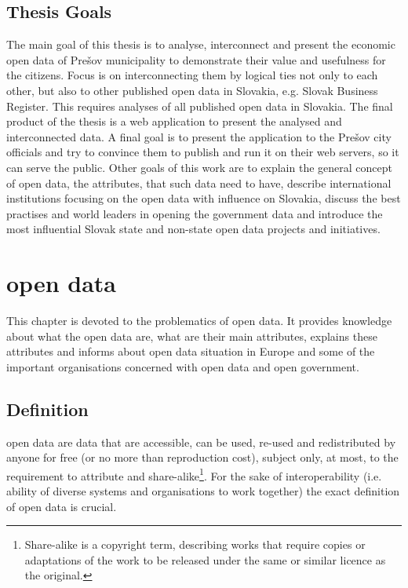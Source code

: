 \documentclass[thesis=B,english]{FITthesis}[2012/06/26]
\begin{document}
\begin{introduction}
	\section*{Thesis Goals}
	The main goal of this thesis is to analyse, interconnect and present the economic open data of Prešov municipality to demonstrate their value and usefulness for the citizens. Focus is on interconnecting them by logical ties not only to each other, but also to other published open data in Slovakia, e.g. Slovak Business Register. This requires analyses of all published open data in Slovakia. The final product of the thesis is a web application to present the analysed and interconnected data. A final goal is to present the application to the Prešov city officials and try to convince them to publish and run it on their web servers, so it can serve the public. Other goals of this work are to explain the general concept of open data, the attributes, that such data need to have, describe international institutions focusing on the open data with influence on Slovakia, discuss the best practises and world leaders in opening the government data and introduce the most influential Slovak state and non-state open data projects and initiatives.

\end{introduction}

\chapter{open data}
\label{opendatadefinition}
	This chapter is devoted to the problematics of open data. It provides knowledge about what the open data are, what are their main attributes, explains these attributes and informs about open data situation in Europe and some of the important organisations concerned with open data and open government.
	\section{Definition}
	open data are data that are accessible, can be used, re-used and redistributed by anyone for free (or no more than reproduction cost), subject only, at most, to the requirement to attribute and share-alike\footnote{Share-alike is a copyright term, describing works that require copies or adaptations of the work to be released under the same or similar licence as the original.}. For the sake of interoperability (i.e. ability of diverse systems and organisations to work together) the exact definition of open data is crucial. \cite{opendatahandbook} 
\end{document}
